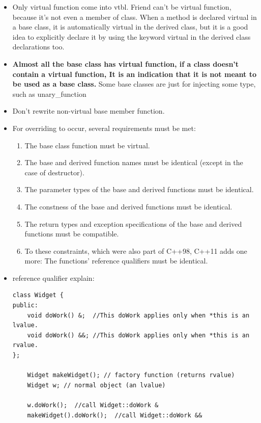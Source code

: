 \documentclass[a4paper,11pt,twoside]{book}
\begin{document}
\begin{itemize}
	
	\item Only virtual function come into vtbl. Friend can't be virtual function, because it's not even a member of class. When a method is declared virtual in a base class, it is automatically virtual in the derived class, but it is a good idea to explicitly declare it by using the keyword virtual in the derived class declarations too.
	
	\item \textbf{Almost all the base class has virtual function, if a class doesn't contain a virtual function, It is an indication that it is not meant to be used as a base class.} Some base classes are just for injecting some type, such as unary\_function 
	
	\item Don't rewrite non-virtual base member function.
	
	\item For overriding to occur, several requirements must be met:
	\begin{enumerate}
		\item The base class function must be virtual.
		\item The base and derived function names must be identical (except in the case of
		destructor).
		\item The parameter types of the base and derived functions must be identical.
		\item The constness of the base and derived functions must be identical.
		\item The return types and exception specifications of the base and derived functions
		must be compatible.
		\item To these constraints, which were also part of C++98, C++11 adds one more: The functions' reference qualifiers must be identical.
	\end{enumerate}
	\item reference qualifier explain:
\begin{lstlisting}
class Widget {
public:
	void doWork() &;  //This doWork applies only when *this is an lvalue.
	void doWork() &&; //This doWork applies only when *this is an rvalue.
}; 
	
	Widget makeWidget(); // factory function (returns rvalue)
	Widget w; // normal object (an lvalue)
	
	w.doWork();  //call Widget::doWork &
	makeWidget().doWork();  //call Widget::doWork &&
	

\end{lstlisting}
\end{itemize}
\end{document}
